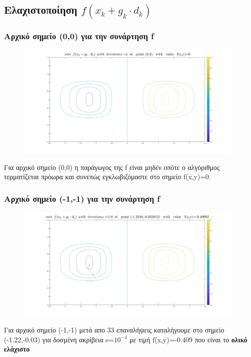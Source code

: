 \documentclass{article}
\begin{document}
\subsection*{Ελαχιστοποίηση $f(x_k+g_k \cdot d_k )$}
\subsubsection*{Αρχικό σημείο (0,0) για την συνάρτηση f}
\begin{figure}[h!]	
     \centering  
     \advance\leftskip-0.2cm  
  \includegraphics[width=130mm,scale=2]{mfa.jpg}
\end{figure} 
Για αρχικό σημείο (0,0) η παράγωγος της f είναι μηδέν οπότε ο αλγόριθμος τερματίζεται πρόωρα και συνεπώς εγκλωβιζόμαστε στο σημείο f(x,y)=0.
 \subsubsection*{Αρχικό σημείο (-1,-1) για την συνάρτηση f}
\begin{figure}[h!]	
     \centering  
     \advance\leftskip-0.2cm  
  \includegraphics[width=130mm,scale=2]{ml2.jpg}
\end{figure} 
Για αρχικό σημείο (-1,-1) μετά απο 33 επαναλήψεις καταλήγουμε στο σημείο (-1.22,-0.03) για  δοσμένη ακρίβεια e=$10^{-4}$ με τιμή f(x,y)=-0.409 που είναι  το \textbf{ολικό ελάχιστο}
\newpage
\end{document}
